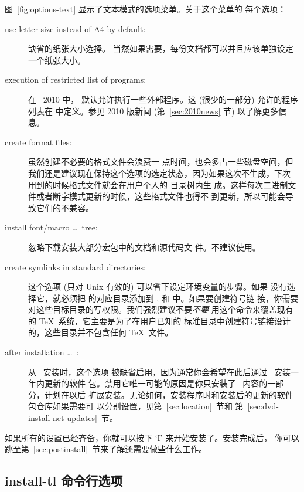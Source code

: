 \documentclass{article}
\begin{document}
图~\ref{fig:options-text} 显示了文本模式的选项菜单。关于这个菜单的
每个选项：

\begin{description}
\item[use letter size instead of A4 by default:] 缺省的纸张大小选择。
当然如果需要，每份文档都可以并且应该单独设定一个纸张大小。

\item[execution of restricted list of programs:] 在 \TL\ 2010 中，
默认允许执行一些外部程序。这 (很少的一部分) 允许的程序列表在
 中定义。参见 2010 版新闻 (第~\ref{sec:2010news} 节)
以了解更多信息。

\item[create format files:] 虽然创建不必要的格式文件会浪费一
点时间，也会多占一些磁盘空间，但
我们还是建议现在保持这个选项的选定状态，因为如果这次不生成，下次
用到的时候格式文件就会在用户个人的  目录树内生
成。这样每次二进制文件或者断字模式更新的时候，这些格式文件也得不
到更新，所以可能会导致它们的不兼容。

\item[install font/macro \ldots\ tree:] 忽略下载安装大部分宏包中的文档和源代码文
件。不建议使用。

\item[create symlinks in standard directories:]
这个选项 (只对 Unix 有效的) 可以省下设定环境变量的步骤。如果
没有选择它，就必须把 \TL{} 的对应目录添加到 ,
 和  中。如果要创建符号链
接，你需要对这些目标目录的写权限。我们强烈建议不要\emph{不要}
用这个命令来覆盖现有的 \TeX\ 系统，它主要是为了在用户已知的
标准目录中创建符号链接设计的，这些目录并不包含任何 \TeX\ 文件。

\item[after installation \ldots\ \CTAN:] 从 \DVD\ 安装时，这个选项
被缺省启用，因为通常你会希望在此后通过 \CTAN\ 安装一年内更新的软件
包。禁用它唯一可能的原因是你只安装了 \DVD\ 内容的一部分，计划在以后
扩展安装。无论如何，安装程序时和安装后的更新的软件包仓库如果需要可
以分别设置，见第~\ref{sec:location}~节和
第~\ref{sec:dvd-install-net-updates}~节。
\end{description}

如果所有的设置已经齐备，你就可以按下 `I' 来开始安装了。安装完成后，
你可以跳至第~\ref{sec:postinstall}~节来了解还需要做些什么工作。

\subsection{install-tl 命令行选项}
\label{sec:cmdline}
\end{document}

